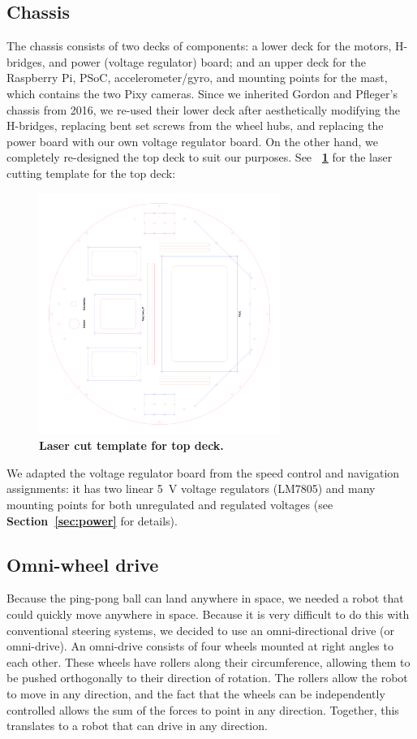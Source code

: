 \documentclass[letterpaper, 11pt]{article}
\newcommand*{\figref}[1]{\textbf{\figurename~\ref{#1}}}
\newcommand*{\secref}[1]{\textbf{Section~\ref{#1}}}
\begin{document}
\begin{enumerate}[label=\textbf{\arabic*.}]
\subsection{Chassis}
The chassis consists of two decks of components: a lower deck for the motors, H-bridges, and power (voltage regulator) board; and an upper deck for the Raspberry Pi, PSoC, accelerometer/gyro, and mounting points for the mast, which contains the two Pixy cameras. Since we inherited Gordon and Pfleger's chassis from 2016, we re-used their lower deck after aesthetically modifying the H-bridges, replacing bent set screws from the wheel hubs, and replacing the power board with our own voltage regulator board. On the other hand, we completely re-designed the top deck to suit our purposes. See \figref{fig:topdeck} for the laser cutting template for the top deck:
\begin{figure}[ht]
    \centering
    \includegraphics[width=0.7\textwidth]{images/topdeck.png}
    \caption{\textbf{Laser cut template for top deck.}}
    \label{fig:topdeck}
\end{figure}

We adapted the voltage regulator board from the speed control and navigation assignments: it has two linear \SI{5}{V} voltage regulators (LM7805) and many mounting points for both unregulated and regulated voltages (see \secref{sec:power} for details).

\subsection{Omni-wheel drive}
Because the ping-pong ball can land anywhere in space, we needed a robot that could quickly move anywhere in space. Because it is very difficult to do this with conventional steering systems, we decided to use an omni-directional drive (or omni-drive). An omni-drive consists of four wheels mounted at right angles to each other. These wheels have rollers along their circumference, allowing them to be pushed orthogonally to their direction of rotation. The rollers allow the robot to move in any direction, and the fact that the wheels can be independently controlled allows the sum of the forces to point in any direction. Together, this translates to a robot that can drive in any direction.


\end{enumerate}
\end{document}
